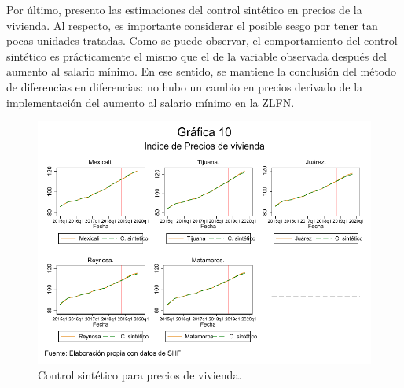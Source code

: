 Por último, presento las estimaciones del control sintético en precios de la vivienda. Al respecto, es importante considerar el posible sesgo por tener tan pocas unidades tratadas. Como se puede observar, el comportamiento del control sintético es prácticamente el mismo  que el de la variable observada después del aumento al salario mínimo. En ese sentido, se mantiene la conclusión del método de diferencias en diferencias: no hubo un cambio en precios derivado de la implementación del aumento al salario mínimo en la ZLFN.

\begin{figure}[H]
\includegraphics[width=\textwidth]{Figures/synth.pdf}
\caption{Control sintético para precios de vivienda.}
\label{fig:10}
\end{figure}
